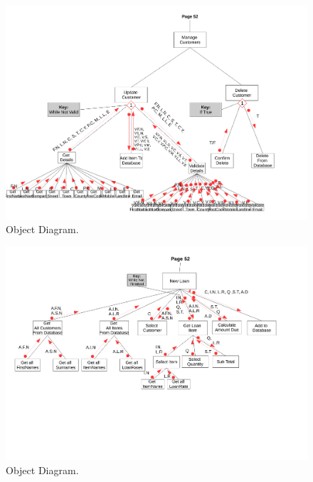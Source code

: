 \begin{landscape}
\newpage

\begin{figure}[H]
    \begin{center}
    \includegraphics[width=500px]{./Design/top_down_design/manage_customers.pdf}
    \caption{Object Diagram.} \label{fig:object_diagram}
    \end{center}
\end{figure}

\newpage

\begin{figure}[H]
    \begin{center}
    \includegraphics[width=500px]{./Design/top_down_design/new_loan.pdf}
    \caption{Object Diagram.} \label{fig:object_diagram}
    \end{center}
\end{figure}


\end{landscape}
